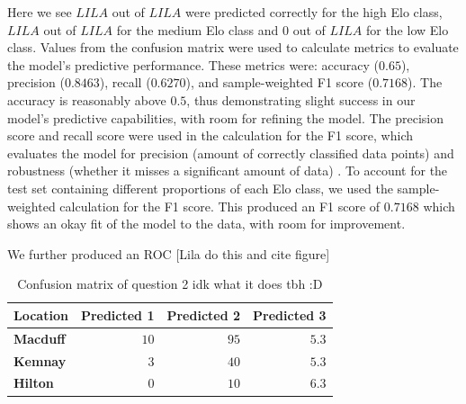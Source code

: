 \documentclass[10pt,a4paper]{article}
\begin{document}
\begin{multicols}{2}
Here we see $ LILA $ out of $LILA$ were predicted correctly for the high Elo class, $LILA$ out of $LILA$ for the medium Elo class and $0$ out of $LILA$ for the low Elo class. Values from the confusion matrix were used to calculate metrics to evaluate the model's predictive performance. These metrics were: accuracy ($0.65$), precision ($0.8463$), recall ($0.6270$), and sample-weighted F1 score ($0.7168$). The accuracy is reasonably above $0.5$, thus demonstrating slight success in our model's predictive capabilities, with room for refining the model. The precision score and recall score were used in the calculation for the F1 score, which evaluates the model for precision (amount of correctly classified data points) and robustness (whether it misses a significant amount of data) \cite{MetricsToEvaluateYourML}. To account for the test set containing different proportions of each Elo class, we used the sample-weighted calculation for the F1 score. This produced an F1 score of $0.7168$ which shows an okay fit of the model to the data, with room for improvement. \newline

We further produced an ROC [Lila do this and cite figure]

\begin{table}[H]
  \centering
  \caption{Confusion matrix of question 2 idk what it does tbh :D}
  \label{tab:confusion_matrix}
    \begin{tabular}{lrrr}
        \toprule
        \textbf{Location}&\textbf{Predicted 1}&\textbf{Predicted 2}&\textbf{Predicted 3}\\
        \midrule
        \textbf{Macduff}&$10$&$ 95$&$5.3$\tabularnewline
        \textbf{Kemnay}&$ 3$&$ 40$&$5.3$\tabularnewline
        \textbf{Hilton}&$ 0$&$ 10$&$6.3$\tabularnewline
        \hline
    \end{tabular}
\end{table}




\end{multicols}
\end{document}
